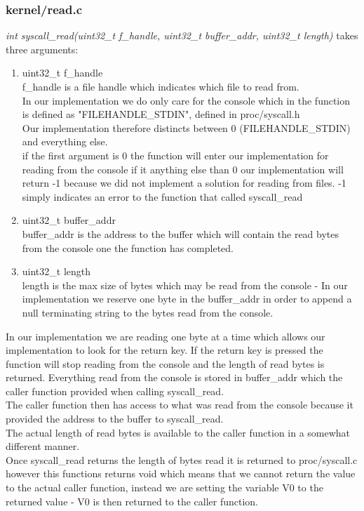 \documentclass[a4paper,12pt,danish]{report}
\begin{document}
\subsubsection{kernel/read.c}
\textit{int syscall\_read(uint32\_t f\_handle, uint32\_t buffer\_addr, uint32\_t length)} takes three arguments:
\begin{enumerate}
    \item{uint32\_t f\_handle}
        \\
        f\_handle is a file handle which indicates which file to read from.
        \\
        In our implementation we do only care for the console which in the function is defined as "FILEHANDLE\_STDIN", defined in proc/syscall.h\\
        Our implementation therefore distincts between 0 (FILEHANDLE\_STDIN) and everything else.\\
        if the first argument is 0 the function will enter our implementation for reading from the console if it anything else than 0 our implementation will return -1 because we did not implement a solution for reading from files. -1 simply indicates an error to the function that called syscall\_read
    \item{uint32\_t buffer\_addr}
        \\
        buffer\_addr is the address to the buffer which will contain the read bytes from the console one the function has completed.
    \item{uint32\_t length}
        \\
        length is the max size of bytes which may be read from the console - In our implementation we reserve one byte in the buffer\_addr in order to append a null terminating string to the bytes read from the console.
\end{enumerate}
In our implementation we are reading one byte at a time which allows our implementation to look for the return key. If the return key is pressed the function will stop reading from the console and the length of read bytes is returned. Everything read from the console is stored in buffer\_addr which the caller function provided when calling syscall\_read.\\
The caller function then has access to what was read from the console because it provided the address to the buffer to syscall\_read.
\\
The actual length of read bytes is available to the caller function in a somewhat different manner.
\\
Once syscall\_read returns the length of bytes read it is returned to proc/syscall.c however this functions returns void which means that we cannot return the value to the actual caller function, instead we are setting the variable V0 to the returned value - V0 is then returned to the caller function.
\end{document}
